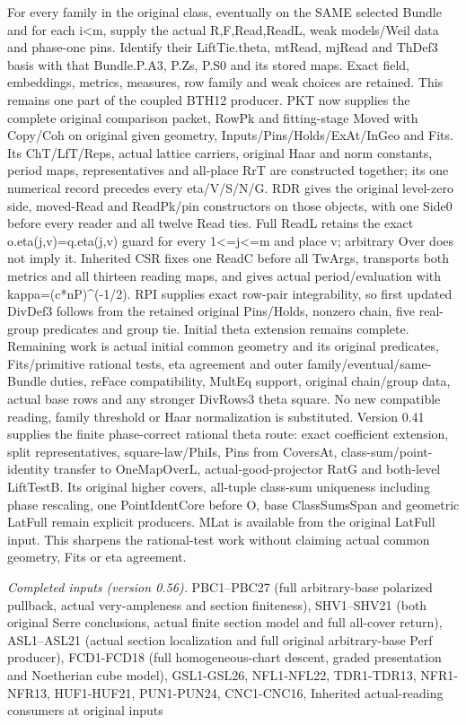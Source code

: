 For every family in the original class, eventually on the SAME selected Bundle and for each i<m, supply the actual R,F,Read,ReadL, weak models/Weil data and phase-one pins. Identify their LiftTie.theta, mtRead, mjRead and ThDef3 basis with that Bundle.P.A3, P.Zs, P.S0 and its stored maps. Exact field, embeddings, metrics, measures, row family and weak choices are retained. This remains one part of the coupled BTH12 producer. PKT now supplies the complete original comparison packet, RowPk and fitting-stage Moved with Copy/Coh on original given geometry, Inputs/Pins/Holds/ExAt/InGeo and Fits. Its ChT/LfT/Reps, actual lattice carriers, original Haar and norm constants, period maps, representatives and all-place RrT are constructed together; its one numerical record precedes every eta/V/S/N/G. RDR gives the original level-zero side, moved-Read and ReadPk/pin constructors on those objects, with one Side0 before every reader and all twelve Read ties. Full ReadL retains the exact o.eta(j,v)=q.eta(j,v) guard for every 1<=j<=m and place v; arbitrary Over does not imply it. Inherited CSR fixes one ReadC before all TwArgs, transports both metrics and all thirteen reading maps, and gives actual period/evaluation with kappa=(c*nP)\textasciicircum{}(-1/2). RPI supplies exact row-pair integrability, so first updated DivDef3 follows from the retained original Pins/Holds, nonzero chain, five real-group predicates and group tie. Initial theta extension remains complete. Remaining work is actual initial common geometry and its original predicates, Fits/primitive rational tests, eta agreement and outer family/eventual/same-Bundle duties, reFace compatibility, MultEq support, original chain/group data, actual base rows and any stronger DivRows3 theta square. No new compatible reading, family threshold or Haar normalization is substituted. Version 0.41 supplies the finite phase-correct rational theta route: exact coefficient extension, split representatives, square-law/PhiIs, Pins from CoversAt, class-sum/point-identity transfer to OneMapOverL, actual-good-projector RatG and both-level LiftTestB. Its original higher covers, all-tuple class-sum uniqueness including phase rescaling, one PointIdentCore before O, base ClassSumsSpan and geometric LatFull remain explicit producers. MLat is available from the original LatFull input. This sharpens the rational-test work without claiming actual common geometry, Fits or eta agreement.

\emph{Completed inputs (version 0.56).} PBC1–PBC27 (full arbitrary-base polarized pullback, actual very-ampleness and section finiteness), SHV1–SHV21 (both original Serre conclusions, actual finite section model and full all-cover return), ASL1–ASL21 (actual section localization and full original arbitrary-base Perf producer), FCD1-FCD18 (full homogeneous-chart descent, graded presentation and Noetherian cube model), GSL1-GSL26, NFL1-NFL22, TDR1-TDR13, NFR1-NFR13, HUF1-HUF21, PUN1-PUN24, CNC1-CNC16, Inherited actual-reading consumers at original inputs

